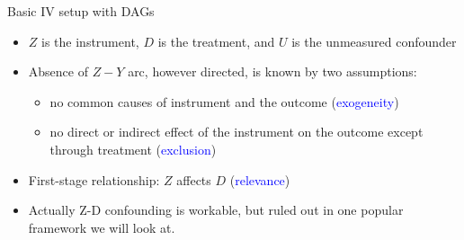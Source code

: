 \documentclass[xcolor=dvipsnames]{beamer}
\begin{document}
\begin{frame}{Basic IV setup with DAGs}

\begin{center}
\end{center}

\pause

\begin{itemize}[<+->]
\small
\item
  \(Z\) is the instrument, \(D\) is the treatment, and \(U\) is the
  unmeasured confounder
\item
  Absence of $Z-Y$ arc, however directed, is known by two assumptions:
  \begin{itemize}[<+->]
  \item
    no common causes of instrument and the outcome (\textcolor{Blue}{exogeneity})
  \item
    no direct or indirect effect of the instrument on the outcome except through treatment (\textcolor{Blue}{exclusion})
  \end{itemize}
\item
  First-stage relationship: \(Z\) affects \(D\)  (\textcolor{Blue}{relevance})
  \item Actually Z-D confounding is workable, but ruled out in one popular framework we will look at. 
  \end{itemize}
\end{frame}
\end{document}
